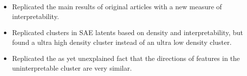 \begin{itemize}
    \item Replicated the main results of original articles with a new measure of interpretability.
    \item Replicated clusters in SAE latents based on density and interpretability, but found a ultra high density cluster instead of an ultra low density cluster.
    \item Replicated the as yet unexplained fact that the directions of features in the uninterpretable cluster are very similar.
\end{itemize}